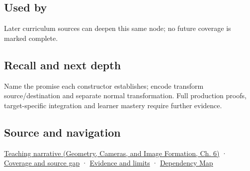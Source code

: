 \subsection{Used by}\label{appendix-380a220e2529-used-by}

Later curriculum sources can deepen this same node; no future coverage is marked complete.

\subsection{Recall and next depth}\label{appendix-380a220e2529-recall-and-next-depth}

Name the promise each constructor establishes; encode transform source/destination and separate normal transformation. Full production proofs, target-specific integration and learner mastery require further evidence.

\subsection{Source and navigation}\label{appendix-380a220e2529-source-and-navigation}

\href{../03-Geometry-Cameras-and-Image-Formation/main.pdf\#nameddest=02-foundations-ii-ch037-types-can-remember-the-promises-that-three-components-forget}{Teaching narrative (Geometry, Cameras, and Image Formation, Ch. 6)} · \hyperref[appendix-fd090d982a15-phase-6---parts-501-600]{Coverage and source gap} · \hyperref[appendix-a103e7846d21-phase-6---source-analysis-and-verification]{Evidence and limits} · \hyperref[appendix-4ad47bdd269a]{Dependency Map}
